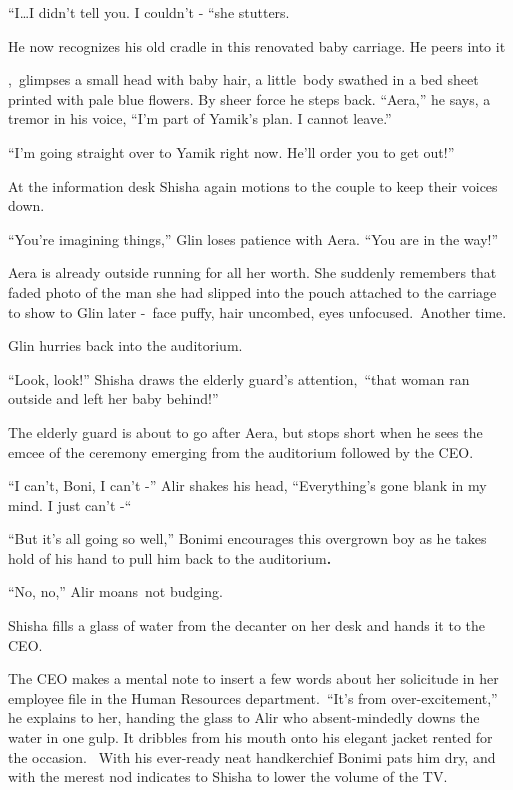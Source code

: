 \documentclass[twoside,11pt]{book}
\begin{document}
``I{\dots}I didn't tell you. I couldn't - ``she stutters.

He now recognizes his old cradle in this renovated baby carriage. He peers into it

,{\ }glimpses a  small head with baby hair, a little{\ }body
swathed in a bed sheet printed with pale blue flowers. By sheer force he steps back.
``Aera,'' he says, a tremor in his voice, ``I'm part of Yamik's plan. I cannot
leave.'' 

``I'm going straight over to Yamik right now. He'll order you to get out!'' 

At the information desk Shisha again motions to the couple to keep their voices down.

``You're imagining things,'' Glin loses patience with Aera. ``You are in the
way!''

Aera is already outside running for all her worth. She suddenly remembers that faded photo of the man she had slipped
into the pouch attached to the carriage to show to Glin later -\ face puffy, hair uncombed, eyes unfocused.\ Another
time.

Glin hurries back into the auditorium. 

``Look, look!'' Shisha draws the elderly guard's attention,\ ``that woman ran
outside and left her baby behind!'' 

The elderly guard is about to go after Aera, but stops short when he sees the emcee of the ceremony emerging from the
auditorium followed by the CEO.

``I can't, Boni, I can't -'' Alir shakes his head, ``Everything's gone blank in my mind. I
just can't -``~ 

``But it's all going so well,'' Bonimi encourages this overgrown boy as he takes hold of his
hand to pull him back to the auditorium\textbf{. }

``No, no,'' Alir moans~not budging.

Shisha fills a glass of water from the decanter on her desk and hands it to the CEO.

The CEO makes a mental note to insert a few words about her solicitude in her employee file in the Human Resources
department.\  ``It's from over-excitement,'' he explains to her, handing the glass to Alir
who absent-mindedly downs the water in one gulp. It dribbles from his mouth onto his elegant jacket rented for the
occasion. \ With his ever-ready neat handkerchief Bonimi pats him dry, and with the merest nod indicates to Shisha to
lower the volume of the TV.
\end{document}
